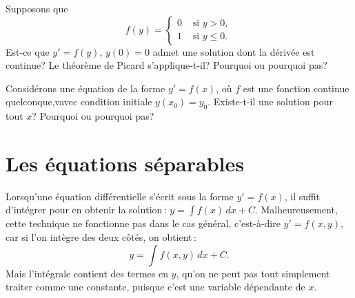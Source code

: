 \begin{exercise}[défi]
Supposons que 
\begin{equation*}
f(y) =
\begin{cases}
0 & \text{ si $y > 0$}, \\
1 & \text{ si $y \leq 0$} .
\end{cases}
\end{equation*}
Est-ce que $y' = f(y)$, $y(0) = 0$ admet une solution dont la dérivée est continue?  Le théorème de Picard s'applique-t-il?  Pourquoi ou pourquoi pas?
\end{exercise}
 
\begin{exercise}
Considérons une équation de la forme $y' = f(x)$, où $f$ est une fonction continue quelconque,vavec condition initiale $y(x_0) = y_0$.  Existe-t-il une solution pour tout $x$?  Pourquoi ou pourquoi pas?

\end{exercise}


\sectionnewpage
\section{Les équations séparables}
\label{separable:section}


Lorsqu'une équation différentielle s'écrit sous la forme 
$y' = f(x)$,
il suffit d'intégrer pour en obtenir la solution\,:
$y = \int f(x) \,dx + C$. 
Malheureusement, cette technique ne fonctionne pas dans le cas général, c'est-à-dire 
$y' = f(x,y)$,
car si l'on intègre des deux côtés, on obtient\,: 
\begin{equation*}
y = \int f(x,y) \,dx + C .
\end{equation*}
Mais l'intégrale contient des termes en $y$, qu'on ne peut pas tout simplement \og{}traiter comme une constante\fg{}, puisque c'est une variable dépendante de $x$.

